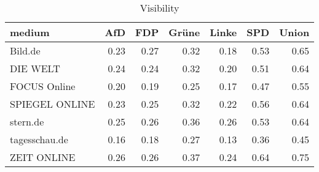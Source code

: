 \begin{table}[ht]
\centering
\begin{tabular}{lrrrrrr}
  \hline
medium & AfD & FDP & Grüne & Linke & SPD & Union \\ 
  \hline
Bild.de & 0.23 & 0.27 & 0.32 & 0.18 & 0.53 & 0.65 \\ 
  DIE WELT & 0.24 & 0.24 & 0.32 & 0.20 & 0.51 & 0.64 \\ 
  FOCUS Online & 0.20 & 0.19 & 0.25 & 0.17 & 0.47 & 0.55 \\ 
  SPIEGEL ONLINE & 0.23 & 0.25 & 0.32 & 0.22 & 0.56 & 0.64 \\ 
  stern.de & 0.25 & 0.26 & 0.36 & 0.26 & 0.53 & 0.64 \\ 
  tagesschau.de & 0.16 & 0.18 & 0.27 & 0.13 & 0.36 & 0.45 \\ 
  ZEIT ONLINE & 0.26 & 0.26 & 0.37 & 0.24 & 0.64 & 0.75 \\ 
   \hline
\end{tabular}
\caption{Visibility} 
\end{table}
